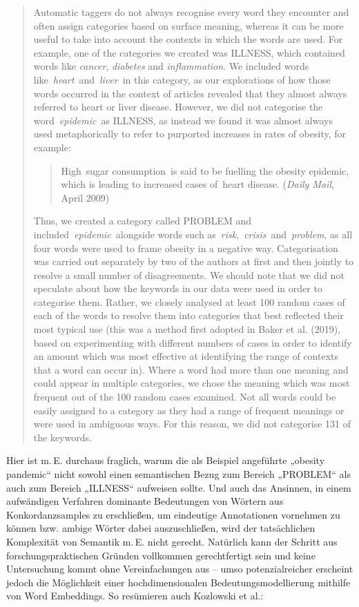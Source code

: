 \begin{quote}
Automatic taggers do not always recognise every word they encounter and often assign categories based on surface meaning, whereas it can be more useful to take into account the contexts in which the words are used. For example, one of the categories we created was ILLNESS, which contained words like \emph{cancer}, \emph{diabetes} and \emph{inflammation}. We included words like~\emph{heart}~and~\emph{liver}~in this category, as our explorations of how those words occurred in the context of articles revealed that they almost always referred to heart or liver disease. However, we did not categorise the word~\emph{epidemic}~as ILLNESS, as instead we found it was almost always used metaphorically to refer to purported increases in rates of obesity, for example:

\begin{quote}
High~sugar consumption~is said to be fuelling the obesity epidemic, which is leading to increased cases of~heart disease. (\emph{Daily Mail}, April 2009)
\end{quote}

Thus, we created a category called PROBLEM and included~\emph{epidemic}~alongside words such as~\emph{risk},~\emph{crisis}~and~\emph{problem}, as all four words were used to frame obesity in a negative way. Categorisation was carried out separately by two of the authors at first and then jointly to resolve a small number of disagreements. We should note that we did not speculate about how the keywords in our data were used in order to categorise them. Rather, we closely analysed at least 100 random cases of each of the words to resolve them into categories that best reflected their most typical use (this was a method first adopted in Baker et al. (2019), based on experimenting with different numbers of cases in order to identify an amount which was most effective at identifying the range of contexts that a word can occur in). Where a word had more than one meaning and could appear in multiple categories, we chose the meaning which was most frequent out of the 100 random cases examined. Not all words could be easily assigned to a category as they had a range of frequent meanings or were used in ambiguous ways. For this reason, we did not categorise 131 of the keywords. \autocite[4]{bakerChangingFramesObesity2020}
\end{quote}

Hier ist m.\,E. durchaus fraglich, warum die als Beispiel angeführte „obesity pandemic`` nicht sowohl einen semantischen Bezug zum Bereich „PROBLEM`` als auch zum Bereich „ILLNESS`` aufweisen sollte. Und auch das Ansinnen, in einem aufwändigen Verfahren dominante Bedeutungen von Wörtern aus Konkordanzsamples zu erschließen, um eindeutige Annotationen vornehmen zu können bzw. ambige Wörter dabei auszuschließen, wird der tatsächlichen Komplexität von Semantik m.\,E. nicht gerecht. Natürlich kann der Schritt aus forschungspraktischen Gründen vollkommen gerechtfertigt sein und keine Untersuchung kommt ohne Vereinfachungen aus -- umso potenzialreicher erscheint jedoch die Möglichkeit einer hochdimensionalen Bedeutungsmodellierung mithilfe von Word Embeddings. So resümieren auch Kozlowski et al.:

